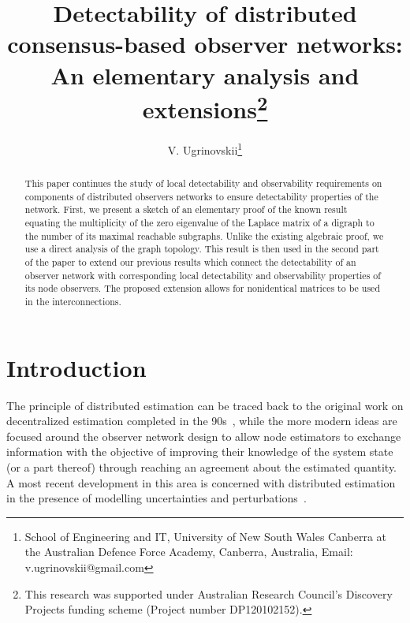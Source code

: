 \documentclass[a4paper,10pt,conference]{ieeeconf}
\begin{document}
\title{Detectability of distributed
  consensus-based observer networks:\\ An elementary analysis and
  extensions\thanks{This research was supported under Australian Research 
    Council's Discovery
Projects funding scheme (Project number DP120102152).}}

\author{V. Ugrinovskii\thanks{School of Engineering and IT, University of
    New South Wales Canberra
  at the Australian Defence Force Academy, Canberra, Australia, Email:
  v.ugrinovskii@gmail.com}} 

\maketitle
          


\begin{abstract}
This paper continues the study of local detectability and
observability requirements on components of distributed observers networks 
to ensure detectability properties of the network. First, we present a
sketch of an
elementary proof of the known result equating the
multiplicity of the zero eigenvalue of the Laplace matrix of a digraph
to the number of its maximal reachable subgraphs.
Unlike the existing algebraic proof, we use a direct analysis
of the graph topology. This result is then used in the second part of the
paper to extend our previous results which connect the detectability of an
observer network with corresponding local detectability and observability
properties of its node observers. The proposed extension allows for nonidentical
matrices to be used in the interconnections.  
\end{abstract}


\section{Introduction}
The principle of distributed estimation can be traced back to the original work
on decentralized estimation completed in the
90s~\cite{BD-1992,CS-1995}, while the more modern ideas are focused around
the observer network design to allow node
estimators to exchange information with the objective of improving their
knowledge of the system 
state (or a part thereof) through reaching an agreement about the estimated
quantity. 
A most recent development in this area is
concerned with   distributed estimation in the presence of modelling
uncertainties and perturbations~\cite{SWH-2010,U6,LaU1,U7,UFri1}.      
\end{document}

